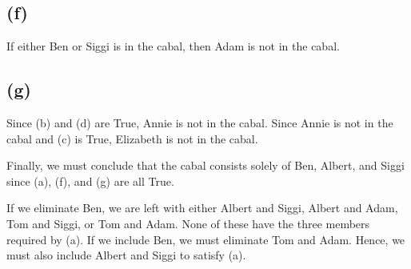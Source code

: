 \documentclass{article}
\begin{document}
\subsection{(f)}
If either Ben or Siggi is in the cabal, then Adam is not in the cabal.
\subsection{(g)}
Since (b) and (d) are True, Annie is not in the cabal. Since Annie is not in the cabal and (c) is True, Elizabeth is not in the cabal.

Finally, we must conclude that the cabal consists solely of Ben, Albert, and Siggi since (a), (f), and (g) are all True.

If we eliminate Ben, we are left with either Albert and Siggi, Albert and Adam, Tom and Siggi, or Tom and Adam. None of these have the three members required by (a). If we include Ben, we must eliminate Tom and Adam. Hence, we must also include Albert and Siggi to satisfy (a).
\end{document}
